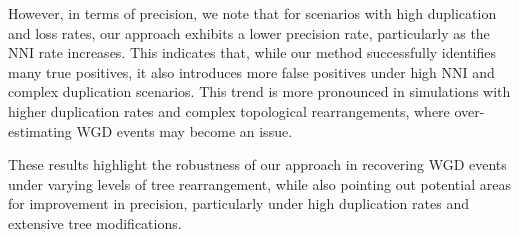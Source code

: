 \documentclass[10pt]{article}
\begin{document}
However, in terms of precision, we note that for scenarios with high duplication and loss rates, our approach exhibits a lower precision rate, particularly as the NNI rate increases. This indicates that, while our method successfully identifies many true positives, it also introduces more false positives under high NNI and complex duplication scenarios. This trend is more pronounced in simulations with higher duplication rates and complex topological rearrangements, where over-estimating WGD events may become an issue.

These results highlight the robustness of our approach in recovering WGD events under varying levels of tree rearrangement, while also pointing out potential areas for improvement in precision, particularly under high duplication rates and extensive tree modifications.
\end{document}
